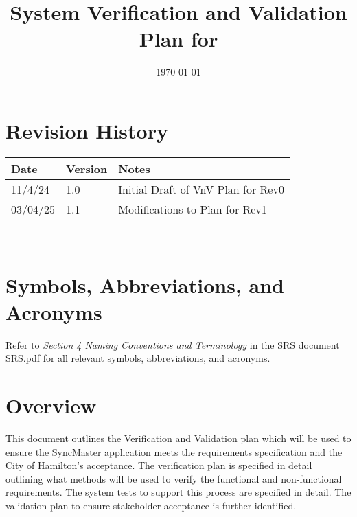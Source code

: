 \documentclass[12pt, titlepage]{article}
\begin{document}
\title{System Verification and Validation Plan for \progname{}}
\author{\authname}
\date{\today}

\maketitle


\section*{Revision History}

\begin{tabularx}{\textwidth}{p{3cm}p{2cm}X}
  \toprule {\bf Date} & {\bf Version} & {\bf Notes}\\
  \midrule
  11/4/24 & 1.0 & Initial Draft of VnV Plan for Rev0\\
  03/04/25 & 1.1 & Modifications to Plan for Rev1\\
  \bottomrule
\end{tabularx}

~\\

\newpage

\tableofcontents

\listoftables

\section*{Symbols, Abbreviations, and Acronyms}

Refer to \textit{Section 4 Naming Conventions and Terminology} in the
SRS document \href{https://github.com/Spitgranger/SyncMaster/blob/main/docs/SRS-Volere/SRS.pdf}{SRS.pdf} 
for all relevant symbols, abbreviations, and acronyms.

\newpage


\section{Overview}

This document outlines the Verification and Validation plan which will be used
to ensure the SyncMaster application meets the requirements specification
and the City of Hamilton's acceptance. The verification plan is specified
in detail outlining what methods will be used to verify the
functional and non-functional
requirements. The system tests to support this process are specified in detail.
The validation plan to ensure stakeholder acceptance is further identified.
\end{document}
